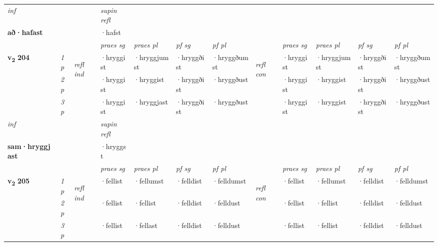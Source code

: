 \begin{longtable}[l]{X>{\footnotesize\itshape}llXXXXlXXXX}
   {\textit{inf}} & &       & \textit{supin refl}  \\*
  {\textbf{að\allowbreak ·hafast}} & &       & ·hafst  \\*

\midrule

 & &   & \textit{praes sg}  & \textit{praes pl}    & \textit{ pf sg} & \textit{pf pl} & & \textit{praes sg}  & \textit{praes pl}    & \textit{pf sg} & \textit{pf pl }  \\ \cmidrule{4-7} \cmidrule{9-12}
 \multirow{2}{*}{{{\textbf{v{\textsubscript{2}}} \Large{\textbf{204}}}}}  & 1p & \multirow{3}{*}{\begin{turn}{90}\textit{refl ind}\end{turn}}  & ·hryggist & ·hryggjumst & ·hryggðist & ·hryggðumst & \multirow{3}{*}{\begin{turn}{90}\textit{refl con}\end{turn}}  &·hryggist & ·hryggjumst & ·hryggðist & ·hryggðumst \\*
 & 2p &  & ·hryggist & ·hryggist & ·hryggðist & ·hryggðust & &·hryggist & ·hryggist & ·hryggðist & ·hryggðust \\*
 & 3p  & & ·hryggist & ·hryggjast & ·hryggðist & ·hryggðust & & ·hryggist & ·hryggist& ·hryggðist & ·hryggðust \\*
\cmidrule{4-7} \cmidrule{9-12}

   {\textit{inf}} & &       & \textit{supin refl}  \\*
  {\textbf{sam\allowbreak ·hryggjast}} & &       & ·hryggst  \\*

\midrule

 & &   & \textit{praes sg}  & \textit{praes pl}    & \textit{ pf sg} & \textit{pf pl} & & \textit{praes sg}  & \textit{praes pl}    & \textit{pf sg} & \textit{pf pl }  \\ \cmidrule{4-7} \cmidrule{9-12}
 \multirow{2}{*}{{{\textbf{v{\textsubscript{2}}} \Large{\textbf{205}}}}}  & 1p & \multirow{3}{*}{\begin{turn}{90}\textit{refl ind}\end{turn}}  & ·fellist & ·fellumst & ·felldist & ·felldumst & \multirow{3}{*}{\begin{turn}{90}\textit{refl con}\end{turn}}  &·fellist & ·fellumst & ·felldist & ·felldumst \\*
 & 2p &  & ·fellist & ·fellist & ·felldist & ·felldust & &·fellist & ·fellist & ·felldist & ·felldust \\*
 & 3p  & & ·fellist & ·fellast & ·felldist & ·felldust & & ·fellist & ·fellist& ·felldist & ·felldust \\*
\cmidrule{4-7} \cmidrule{9-12}


\end{longtable}
